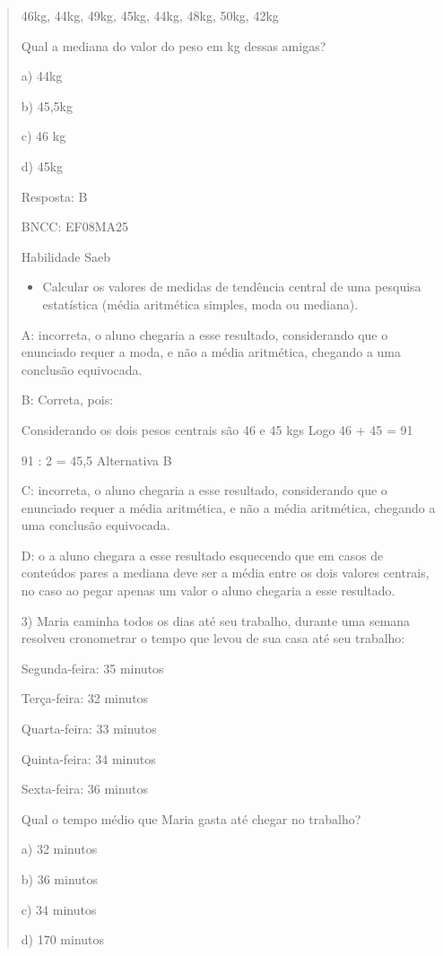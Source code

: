 \begin{quote}
\begin{escolha}
46kg, 44kg, 49kg, 45kg, 44kg, 48kg, 50kg, 42kg

Qual a mediana do valor do peso em kg dessas amigas?

a) 44kg

b) 45,5kg

c) 46 kg

d) 45kg

Resposta: B

BNCC: EF08MA25

Habilidade Saeb

\begin{itemize}
\tightlist
\item
  Calcular os valores de medidas de tendência central de uma pesquisa
  estatística (média aritmética simples, moda ou mediana).
\end{itemize}

A: incorreta, o aluno chegaria a esse resultado, considerando que o
enunciado requer a moda, e não a média aritmética, chegando a uma
conclusão equivocada.

B: Correta, pois:

Considerando os dois pesos centrais são 46 e 45 kgs Logo 46 + 45 = 91

91 : 2 = 45,5 Alternativa B

C: incorreta, o aluno chegaria a esse resultado, considerando que o
enunciado requer a média aritmética, e não a média aritmética, chegando
a uma conclusão equivocada.

D: o a aluno chegara a esse resultado esquecendo que em casos de
conteúdos pares a mediana deve ser a média entre os dois valores
centrais, no caso ao pegar apenas um valor o aluno chegaria a esse
resultado.

3) Maria caminha todos os dias até seu trabalho, durante uma semana
resolveu cronometrar o tempo que levou de sua casa até seu trabalho:

Segunda-feira: 35 minutos

Terça-feira: 32 minutos

Quarta-feira: 33 minutos

Quinta-feira: 34 minutos

Sexta-feira: 36 minutos

Qual o tempo médio que Maria gasta até chegar no trabalho?

a) 32 minutos

b) 36 minutos

c) 34 minutos

d) 170 minutos


\end{escolha}
\end{quote}
